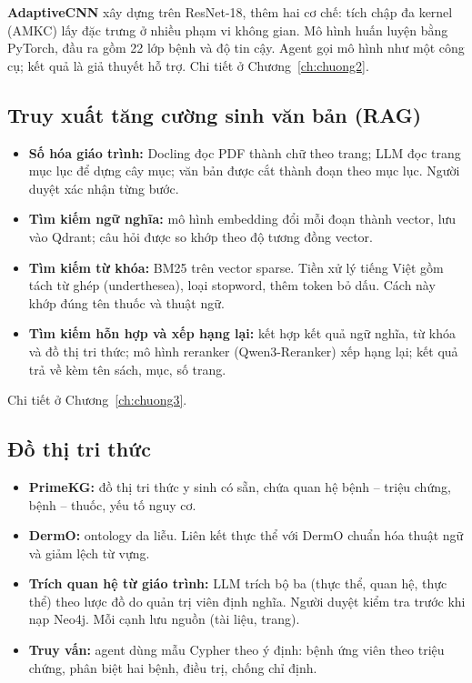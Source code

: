 \textbf{AdaptiveCNN} xây dựng trên ResNet-18, thêm hai cơ chế: tích chập đa kernel (AMKC) lấy đặc trưng ở nhiều phạm vi không gian. Mô hình huấn luyện bằng PyTorch, đầu ra gồm 22 lớp bệnh và độ tin cậy. Agent gọi mô hình như một công cụ; kết quả là giả thuyết hỗ trợ. Chi tiết ở Chương~\ref{ch:chuong2}.

\subsection{Truy xuất tăng cường sinh văn bản (RAG)}
\begin{itemize}
  \item \textbf{Số hóa giáo trình:} Docling đọc PDF thành chữ theo trang; LLM đọc trang mục lục để dựng cây mục; văn bản được cắt thành đoạn theo mục lục. Người duyệt xác nhận từng bước.
  \item \textbf{Tìm kiếm ngữ nghĩa:} mô hình embedding đổi mỗi đoạn thành vector, lưu vào Qdrant; câu hỏi được so khớp theo độ tương đồng vector.
  \item \textbf{Tìm kiếm từ khóa:} BM25 trên vector sparse. Tiền xử lý tiếng Việt gồm tách từ ghép (underthesea), loại stopword, thêm token bỏ dấu. Cách này khớp đúng tên thuốc và thuật ngữ.
  \item \textbf{Tìm kiếm hỗn hợp và xếp hạng lại:} kết hợp kết quả ngữ nghĩa, từ khóa và đồ thị tri thức; mô hình reranker (Qwen3-Reranker) xếp hạng lại; kết quả trả về kèm tên sách, mục, số trang.
\end{itemize}

Chi tiết ở Chương~\ref{ch:chuong3}.

\subsection{Đồ thị tri thức}
\begin{itemize}
  \item \textbf{PrimeKG:} đồ thị tri thức y sinh có sẵn, chứa quan hệ bệnh -- triệu chứng, bệnh -- thuốc, yếu tố nguy cơ.
  \item \textbf{DermO:} ontology da liễu. Liên kết thực thể với DermO chuẩn hóa thuật ngữ và giảm lệch từ vựng.
  \item \textbf{Trích quan hệ từ giáo trình:} LLM trích bộ ba (thực thể, quan hệ, thực thể) theo lược đồ do quản trị viên định nghĩa. Người duyệt kiểm tra trước khi nạp Neo4j. Mỗi cạnh lưu nguồn (tài liệu, trang).
  \item \textbf{Truy vấn:} agent dùng mẫu Cypher theo ý định: bệnh ứng viên theo triệu chứng, phân biệt hai bệnh, điều trị, chống chỉ định.
\end{itemize}

